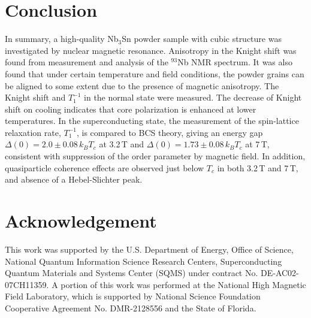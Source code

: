 \documentclass[aps,prl,reprint,superscriptaddress]{revtex4-2}
\begin{document}
	\section{Conclusion}
	In summary, a high-quality Nb$_3$Sn powder sample with cubic structure was investigated by nuclear magnetic resonance. Anisotropy in the Knight shift was found from measurement and analysis of the $^{93}$Nb NMR spectrum. It was also found that under certain temperature and field conditions, the powder grains can be aligned to some extent due to the presence of magnetic anisotropy. The Knight shift and $T_1^{-1}$ in the normal state were measured. The decrease of Knight shift on cooling indicates that core polarization is enhanced at lower temperatures. In the superconducting state, the measurement of the spin-lattice relaxation rate, $T_1^{-1}$, is compared to BCS theory, giving an energy gap $\Delta(0)=2.0\pm0.08\,k_B T_c$ at 3.2\,T and $\Delta(0)=1.73\pm0.08\,k_B T_c$ at 7\,T, consistent with suppression of the order parameter by magnetic field. In addition, quasiparticle coherence effects are observed just below $T_c$ in both 3.2\,T and 7\,T, and absence of a Hebel-Slichter peak.
	
	
	\section{Acknowledgement}
	This work was supported by the U.S. Department of Energy, Office of Science, National Quantum Information  Science Research Centers, Superconducting Quantum Materials and Systems Center (SQMS) under contract No. DE-AC02-07CH11359. A portion of this work was performed at the National High Magnetic Field Laboratory, which is supported by National Science Foundation Cooperative Agreement No. DMR-2128556 and the State of Florida.
	
	
\end{document}
